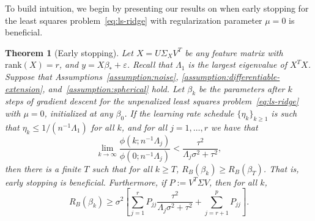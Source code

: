 \documentclass[11pt]{article}
\newtheorem{theorem}{Theorem}
\begin{document}
To build intuition, we begin by presenting our results on when early stopping for the least squares problem~\eqref{eq:ls-ridge} with regularization parameter $\mu = 0$ is beneficial.

\begin{theorem}[Early stopping] \label{thm:earlystopping}
Let $X = U \Sigma_X V^T$ be any feature matrix with $\mathrm{rank}(X) = r$, and $y = X \beta_* + \varepsilon$. Recall that $\Lambda_1$ is the largest eigenvalue of $X^T X$. Suppose that Assumptions~\ref{assumption:noise}, \ref{assumption:differentiable-extension}, and~\ref{assumption:spherical} hold.
Let $\beta_k$ be the parameters after $k$ steps of gradient descent for the unpenalized least squares problem~\eqref{eq:ls-ridge} with $\mu = 0$, initialized at any $\beta_0$.
If the learning rate schedule $\{ \eta_k \}_{k \geq 1}$ is such that $\eta_k \le 1 / (n^{-1} \Lambda_1)$ for all $k$, and for all $j = 1, \ldots, r$ we have that 
\begin{equation} \label{eq:earlystopping_condition}
    \lim_{k \to \infty} \frac{\phi(k; n^{-1} \Lambda_j)}{\phi(0; n^{-1} \Lambda_j)} < \frac{\tau^2}{\Lambda_j \sigma^2 + \tau^2},
\end{equation}
then there is a finite $T$ such that for all $k \ge T$, $R_B(\beta_k) \ge R_B(\beta_T)$. That is, early stopping is beneficial.
Furthermore, if $P := V^T\Sigma V$, then for all $k$, 
\begin{equation} \label{eq:earlystopping_lower}
   R_B(\beta_k) \ge \sigma^2\left[ \sum_{j=1}^r P_{jj}\frac{\tau^2}{\Lambda_j\sigma^2 + \tau^2} + \sum_{j=r+1}^p P_{jj}\right].
\end{equation}
\end{theorem}
\end{document}
